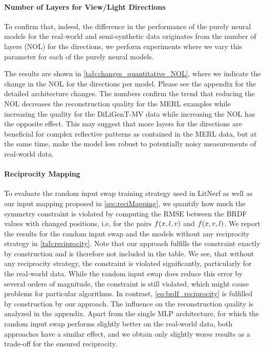 \paragraph{Number of Layers for View/Light Directions}

To confirm that, indeed, the difference in the performance of the purely neural models for the real-world and semi-synthetic data originates from the number of layers (NOL) for the directions, we perform experiments where we vary this parameter for each of the purely neural models. 

The results are shown in \cref{tab:changes_quantitative_NOL}, where we indicate the change in the NOL for the directions per model. Please see the appendix for the detailed architecture changes. The numbers confirm the trend that reducing the NOL decreases the reconstruction quality for the MERL examples while increasing the quality for the DiLiGenT-MV data while increasing the NOL has the opposite effect. This may suggest that more layers for the directions are beneficial for complex reflective patterns as contained in the MERL data, but at the same time, make the model less robust to potentially noisy measurements of real-world data.

\paragraph{Reciprocity Mapping}


To evaluate the random input swap training strategy used in LitNerf \cite{Sarkar23LitNerf} as well as our input mapping proposed in \cref{sec:reciMapping}, we quantify how much the symmetry constraint is violated by computing the RMSE between the BRDF values with changed positions, i.e. for the pairs $f(x, l, v)$ and $f(x, v, l)$. We report the results for the random input swap and the models without any reciprocity strategy in \cref{tab:reciprocity}. Note that our approach fulfills the constraint exactly by construction and is therefore not included in the table. We see, that without any reciprocity strategy, the constraint is violated significantly, particularly for the real-world data. While the random input swap does reduce this error by several orders of magnitude, the constraint is still violated, which might cause problems for particular algorithms. In contrast, \cref{eq:brdf_reciprocity} is fulfilled by construction by our approach.
The influence on the reconstruction quality is analyzed in the appendix. Apart from the single MLP architecture, for which the random input swap performs slightly better on the real-world data, both approaches have a similar effect, and we obtain only slightly worse results as a trade-off for the ensured reciprocity.

